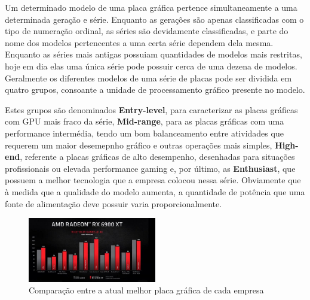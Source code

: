 \documentclass{report}
\begin{document}
\vspace{1cm}
\vspace{5mm} Um determinado modelo de uma placa gráfica pertence simultaneamente a uma determinada geração e série. Enquanto as gerações são apenas classificadas com o tipo de numeração ordinal, as séries são devidamente classificadas, e parte do nome dos modelos pertencentes a uma certa série dependem dela mesma. \newline
Enquanto as séries mais antigas possuiam quantidades de modelos mais restritas, hoje em dia elas uma única série pode possuir cerca de uma dezena de modelos. Geralmente os diferentes modelos de uma série de placas pode ser dividida em quatro grupos, consoante a unidade de processamento gráfico presente no modelo.

\vspace{5mm} Estes grupos são denominados \textbf{Entry-level}, para caracterizar as placas gráficas com GPU mais fraco da série, \textbf{Mid-range}, para as placas gráficas com uma performance intermédia, tendo um bom balanceamento entre atividades que requerem um maior desemepnho gráfico e outras operações mais simples, \textbf{High-end}, referente a placas gráficas de alto desempenho, desenhadas para situações profissionais ou elevada performance gaming e, por último, as \textbf{Enthusiast}, que possuem a melhor tecnologia que a empresa colocou nessa série. Obviamente que à medida que a qualidade do modelo aumenta, a quantidade de potência que uma fonte de alimentação deve possuir varia proporcionalmente.
\vspace{5mm}
\begin{figure}[h]
\centering
\includegraphics[width=0.5\textwidth]{comp.png}
\caption{Comparação entre a atual melhor placa gráfica de cada empresa}
\label{fig:comp}
\end{figure}
\end{document}
